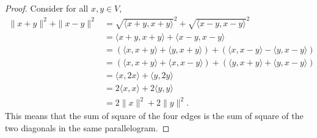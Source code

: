 \begin{Exercise}
\begin{proof}
Consider for all $x,y\in V$,
\begin{align*}
\| x+y \|^2 + \| x-y \|^2
&= \sqrt{\langle x+y, x+y \rangle}^2 + \sqrt{\langle x-y, x-y \rangle}^2 \\
&= \langle x+y, x+y \rangle + \langle x-y, x-y \rangle \\
&= (\langle x,x+y \rangle + \langle y,x+y \rangle) + (\langle x,x-y \rangle - \langle y,x-y \rangle) \\
&= (\langle x,x+y \rangle + \langle x, x-y \rangle) + (\langle y,x+y \rangle + \langle y,x-y \rangle) \\
&= \langle x,2x \rangle + \langle y,2y \rangle \\
&= 2\langle x,x \rangle + 2\langle y,y \rangle \\
&= 2\|x\|^2 + 2\|y\|^2.
\end{align*}
This means that the sum of square of the four edges is
the sum of square of the two diagonals in the same parallelogram.
\end{proof}
\end{Exercise}